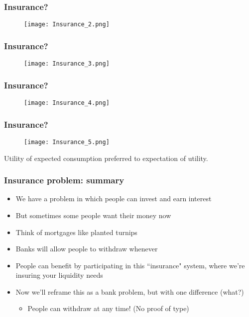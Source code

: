 \documentclass{beamer}
\begin{document}
\begin{frame}
\frametitle{Insurance?}
\begin{figure}
\centering
\texttt{[image: Insurance\_2.png]}
\end{figure}
\end{frame}

\begin{frame}
\frametitle{Insurance?}
\begin{figure}
\centering
\texttt{[image: Insurance\_3.png]}
\end{figure}
\end{frame}

\begin{frame}
\frametitle{Insurance?}
\begin{figure}
\centering
\texttt{[image: Insurance\_4.png]}
\end{figure}
\end{frame}

\begin{frame}
\frametitle{Insurance?}
\begin{figure}
\centering
\texttt{[image: Insurance\_5.png]}
\end{figure}
Utility of expected consumption preferred to expectation of utility.
\end{frame}


\begin{frame}
\frametitle{Insurance problem: summary}
\begin{itemize}
\item We have a problem in which people can invest and earn interest
\bigskip
\item But sometimes some people want their money now
\bigskip
\item Think of mortgages like planted turnips
\bigskip
\item Banks will allow people to withdraw whenever
\bigskip
\item People can benefit by participating in this ``insurance" system, where we're insuring your liquidity needs
\bigskip
\item Now we'll reframe this as a bank problem, but with one difference (what?)
\bigskip
\begin{itemize}
\item People can withdraw at any time! (No proof of type)
\end{itemize}
\end{itemize}
\end{frame}
\end{document}
